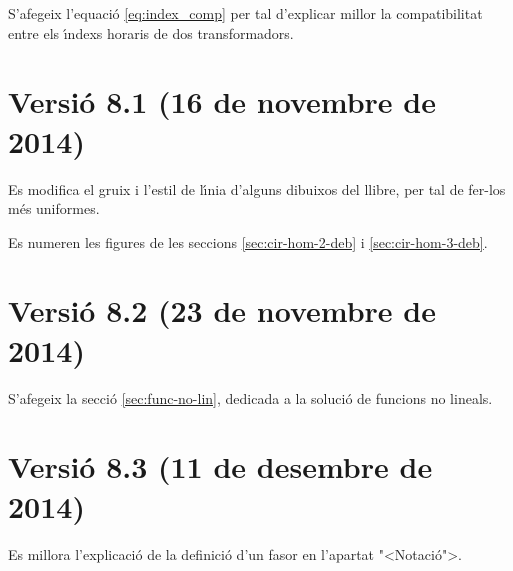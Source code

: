 S'afegeix l'equaci\'{o} \eqref{eq:index_comp} per tal d'explicar millor la compatibilitat entre els \'{\i}ndexs horaris de dos transformadors.

\section*{Versi\'{o} 8.1 (16 de novembre de 2014)}

Es modifica el gruix i l'estil de l\'{\i}nia d'alguns dibuixos del llibre, per tal de fer-los m\'{e}s uniformes.

Es numeren les figures de les seccions \ref{sec:cir-hom-2-deb} i  \ref{sec:cir-hom-3-deb}.


\section*{Versi\'{o} 8.2 (23 de novembre de 2014)}

S'afegeix la secci\'{o} \ref{sec:func-no-lin}, dedicada a la soluci\'{o} de funcions no lineals. 


\section*{Versi\'{o} 8.3 (11 de desembre de 2014)}

Es millora l'explicaci\'{o} de la definici\'{o} d'un fasor en l'apartat {"<}Notaci\'{o}{">}.